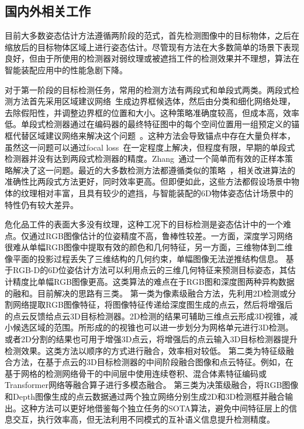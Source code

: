 \documentclass[12pt]{article}
\begin{document}
\subsection{国内外相关工作}

目前大多数姿态估计方法遵循两阶段的范式，首先检测图像中的目标物体，之后在缩放后的目标物体区域上进行姿态估计。尽管现有方法在大多数简单的场景下表现良好，但由于所使用的检测器对弱纹理或被遮挡工件的检测效果并不理想，算法在智能装配应用中的性能急剧下降。

对于第一阶段的目标检测任务，常用的检测方法有两段式和单段式两类\cite{ATSS, fcos, PAA, faster-rcnn, maskrcnn}。两段式检测方法首先采用区域建议网络~\cite{faster-rcnn, maskrcnn}生成边界框候选体，然后由分类和细化网络处理，去除假阳性，并调整边界框的位置和大小。这种策略准确度较高，但成本高，效率低。单段式检测器通过在编码器的最终特征图中的每个空间位置用一组预定义的锚框代替区域建议网络来解决这个问题~\cite{fcos,retinanet,yolov1}。这种方法会导致锚点中存在大量负样本，虽然这一问题可以通过focal loss~\cite{retinanet,fpn}在一定程度上解决，但程度有限，早期的单段式检测器并没有达到两段式检测器的精度。Zhang~\cite{ATSS}通过一个简单而有效的正样本策略解决了这一问题。最近的大多数检测方法都遵循类似的策略~\cite{PAA, autoassign, OTA, TTF, yolov3}，相关改进算法的准确性比两段式方法更好，同时效率更高。但即便如此，这些方法都假设场景中物体的纹理相对丰富，且具有较少的遮挡，与智能装配的6D物体姿态估计场景中的特性仍有较大差异。

危化品工件的表面大多没有纹理，这种工况下的目标检测是姿态估计中的一个难点。仅通过RGB图像估计的位姿精度不高，鲁棒性较差。一方面，深度学习网络很难从单幅RGB图像中提取有效的颜色和几何特征，另一方面，三维物体到二维像平面的投影过程丢失了三维结构的几何约束，单幅图像无法逆推结构信息。
基于RGB-D的6D位姿估计方法可以利用点云的三维几何特征来预测目标姿态，其估计精度比单幅RGB图像更高。这类算法的难点在于RGB图和深度图两种异构数据的融和。目前解决的思路有三类。
第一类为像素级融合方法，先利用2D检测或分割网络提取RGB图像特征，将图像特征传递给深度图生成的点云，然后将增强后的点云反馈给点云3D目标检测器。2D检测的结果可辅助三维点云形成3D视锥\cite{Qi2018}，减小候选区域的范围。所形成的的视锥也可以进一步划分为网格单元\cite{Wang2019}进行3D检测。或者2D分割的结果也可用于增强3D点云\cite{Vora2020}，将增强后的点云输入3D目标检测器提升检测效果。这类方法以顺序的方式进行融合，效率相对较低。
第二类为特征级融合方法，在基于点云的3D目标检测器的中间阶段融合图像和点云特征。例如，在基于网格的检测网络骨干的中间层中使用连续卷积\cite{Liang2018, Liang2019}、混合体素特征编码\cite{Sindagi2019}或Transformer\cite{Zhang2022}网络等融合算子进行多模态融合。
第三类为决策级融合，将RGB图像和Depth图像生成的点云数据通过两个独立网络分别生成2D和3D检测框\cite{Asvadi2018}并融合输出。这种方法可以更好地借鉴每个独立任务的SOTA算法，避免中间特征层上的信息交互，执行效率高，但无法利用不同模式的互补语义信息\cite{Pang2020}提升检测精度。
\end{document}
